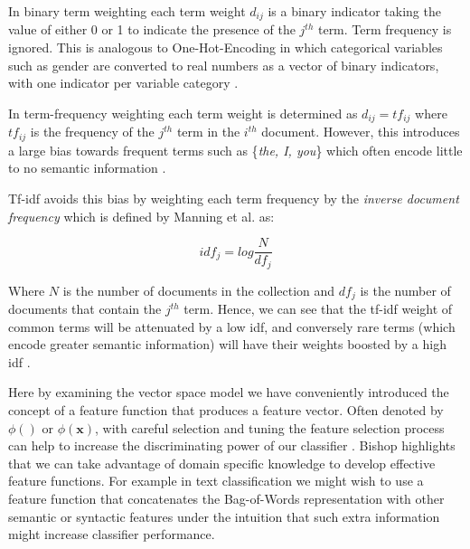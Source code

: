 \documentclass[Dissertation.tex]{subfiles}
\begin{document}
In binary term weighting each term weight $ d_{ij} $ is a binary indicator taking the value of either 0 or 1 to indicate the presence of the $ j^{th} $ term. Term frequency is ignored. This is analogous to One-Hot-Encoding in which categorical variables such as gender are converted to real numbers as a vector of binary indicators, with one indicator per variable category \cite{geronHandsonMachineLearning2017}.

In term-frequency weighting each term weight is determined as $d_{ij} = tf_{ij}$ where $tf_{ij}$ is the frequency of the $ j^{th}$ term in the $i^{th}$ document. However, this introduces a large bias towards frequent terms such as \{\textit{the, I, you}\} which often encode little to no semantic information \cite{manningIntroductionInformationRetrieval2009}.

Tf-idf avoids this bias by weighting each term frequency by the \textit{inverse document frequency} which is defined by Manning et al. \cite{manningIntroductionInformationRetrieval2009} as:

$$idf_j = log \frac{N}{df_j} $$

Where $ N $ is the number of documents in the collection and $ df_j $ is the number of documents that contain the $ j^{th} $ term. Hence, we can see that the tf-idf weight of common terms will be attenuated by a low idf, and conversely rare terms (which encode greater semantic information) will have their weights boosted by a high idf \cite{manningIntroductionInformationRetrieval2009}.

Here by examining the vector space model we have conveniently introduced the concept of a feature function that produces a feature vector. Often denoted by $ \phi() $ or $ \phi(\mathbf{x}) $,  with careful selection and tuning the feature selection process can help to increase the discriminating power of our classifier \cite{bishopPatternRecognitionMachine2006}. Bishop \cite{bishopPatternRecognitionMachine2006} highlights that we can take advantage of domain specific knowledge to develop effective feature functions. For example in text classification we might wish to use a feature function that concatenates the Bag-of-Words representation with other semantic or syntactic features under the intuition that such extra information might increase classifier performance. 
\end{document}
